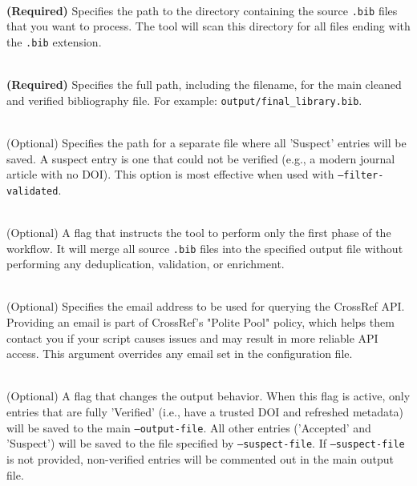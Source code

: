 \documentclass[11pt, a4paper]{article}
\begin{document}
\begin{description}[leftmargin=*,labelindent=1cm]
    \item[\texttt{--input-dir <path>}] \hfill \\
    \textbf{(Required)} Specifies the path to the directory containing the source \texttt{.bib} files that you want to process. The tool will scan this directory for all files ending with the \texttt{.bib} extension.

    \item[\texttt{--output-file <path>}] \hfill \\
    \textbf{(Required)} Specifies the full path, including the filename, for the main cleaned and verified bibliography file. For example: \texttt{output/final\_library.bib}.

    \item[\texttt{--suspect-file <path>}] \hfill \\
    (Optional) Specifies the path for a separate file where all 'Suspect' entries will be saved. A suspect entry is one that could not be verified (e.g., a modern journal article with no DOI). This option is most effective when used with \texttt{--filter-validated}.

    \item[\texttt{--merge-only}] \hfill \\
    (Optional) A flag that instructs the tool to perform only the first phase of the workflow. It will merge all source \texttt{.bib} files into the specified output file without performing any deduplication, validation, or enrichment.

    \item[\texttt{--email <address>}] \hfill \\
    (Optional) Specifies the email address to be used for querying the CrossRef API. Providing an email is part of CrossRef's "Polite Pool" policy, which helps them contact you if your script causes issues and may result in more reliable API access. This argument overrides any email set in the configuration file.

    \item[\texttt{--filter-validated}] \hfill \\
    (Optional) A flag that changes the output behavior. When this flag is active, only entries that are fully 'Verified' (i.e., have a trusted DOI and refreshed metadata) will be saved to the main \texttt{--output-file}. All other entries ('Accepted' and 'Suspect') will be saved to the file specified by \texttt{--suspect-file}. If \texttt{--suspect-file} is not provided, non-verified entries will be commented out in the main output file.
\end{description}
\end{document}
